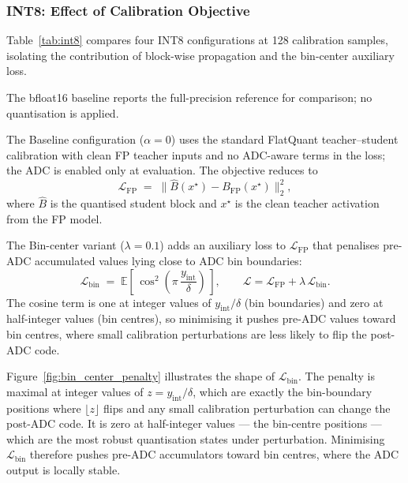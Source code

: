 \documentclass[a4paper,11pt,oneside]{article}
\theoremstyle{breakstyle}
\begin{document}
  \subsubsection{INT8: Effect of Calibration Objective}
  \label{sec:int8_calib}

  Table~\ref{tab:int8} compares four INT8 configurations at 128
  calibration samples, isolating the contribution of block-wise
  propagation and the bin-center auxiliary loss.

  The bfloat16 baseline reports the full-precision reference
  for comparison; no quantisation is applied.

  The Baseline configuration ($\alpha = 0$) uses the standard
  FlatQuant teacher--student calibration with clean FP teacher inputs
  and no ADC-aware terms in the loss; the ADC is enabled only at
  evaluation. The objective reduces to
  \begin{equation}
      \mathcal{L}_{\mathrm{FP}}
      \;=\;
      \bigl\| \hat{B}(x^\star) - B_{\mathrm{FP}}(x^\star) \bigr\|_2^2,
  \end{equation}
  where $\hat{B}$ is the quantised student block and $x^\star$ is the
  clean teacher activation from the FP model.

  The Bin-center variant ($\lambda = 0.1$) adds an auxiliary
  loss to $\mathcal{L}_{\mathrm{FP}}$ that penalises pre-ADC
  accumulated values lying close to ADC bin boundaries:
  \begin{equation}
      \mathcal{L}_{\mathrm{bin}}
      \;=\;
      \mathbb{E}\!\left[\,
          \cos^2\!\left(\pi\,\frac{y_{\mathrm{int}}}{\delta}\right)
      \,\right],
      \qquad
      \mathcal{L} = \mathcal{L}_{\mathrm{FP}}
                  + \lambda\,\mathcal{L}_{\mathrm{bin}}.
  \end{equation}
  The cosine term is one at integer values of
  $y_{\mathrm{int}}/\delta$ (bin boundaries) and zero at half-integer
  values (bin centres), so minimising it pushes pre-ADC values toward
  bin centres, where small calibration perturbations are less likely
  to flip the post-ADC code. 

  Figure~\ref{fig:bin_center_penalty} illustrates the shape of
  $\mathcal{L}_{\mathrm{bin}}$.  The penalty is maximal at integer
  values of $z = y_{\mathrm{int}}/\delta$, which are exactly the
  bin-boundary positions where $\lfloor z \rfloor$ flips and any
  small calibration perturbation can change the post-ADC code.  It
  is zero at half-integer values --- the bin-centre positions ---
  which are the most robust quantisation states under perturbation.
  Minimising $\mathcal{L}_{\mathrm{bin}}$ therefore pushes pre-ADC
  accumulators toward bin centres, where the ADC output is locally
  stable.
\end{document}
